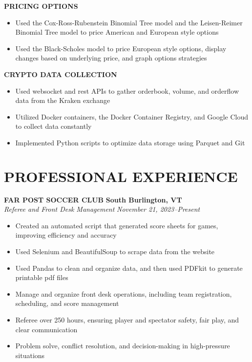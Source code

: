 \documentclass[11pt,letterpaper]{article}
\newcommand{\role}[4]{
  \begin{center}
  \textbf{#1} \hfill \textbf{#2} \\
  \textit{#3} \hfill \textit{#4}
  \end{center}
}
\begin{document}
\begin{flushleft}
  \textbf{PRICING OPTIONS}
  \begin{itemize}[leftmargin=*,nosep] 
    \item Used the Cox-Ross-Rubenstein Binomial Tree model and the Leisen-Reimer Binomial Tree model to price American and European style options
    \item Used the Black-Scholes model to price European style options, display changes based on underlying price, and graph options strategies
  \end{itemize}
\end{flushleft}


\begin{flushleft}
  \textbf{CRYPTO DATA COLLECTION}
  \begin{itemize}[leftmargin=*,nosep]
    \item Used websocket and rest APIs to gather orderbook, volume, and orderflow data from the Kraken exchange
    \item Utilized Docker containers, the Docker Container Registry, and Google Cloud to collect data constantly
    \item Implemented Python scripts to optimize data storage using Parquet and Git
  \end{itemize}
\end{flushleft}

\section{PROFESSIONAL EXPERIENCE}
\vspace{1em}
\role{FAR POST SOCCER CLUB}{South Burlington, VT}{Referee and Front Desk Management}{November 21, 2023--Present}
\begin{itemize}[leftmargin=*,nosep]
  \item Created an automated script that generated score sheets for games, improving efficiency and accuracy
  \item Used Selenium and BeautifulSoup to scrape data from the website
  \item Used Pandas to clean and organize data, and then used PDFkit to generate printable pdf files 
  \item Manage and organize front desk operations, including team registration, scheduling, and score management
  \item Referee over 250 hours, ensuring player and spectator safety, fair play, and clear communication
  \item Problem solve, conflict resolution, and decision-making in high-pressure situations
\end{itemize}
\end{document}
